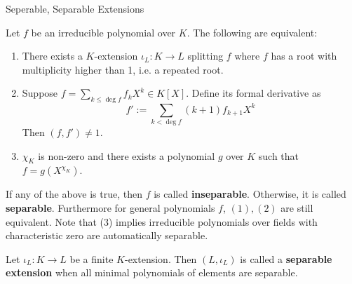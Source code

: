 \documentclass[../book.tex]{subfiles}
\begin{document}
\begin{dfn} Seperable, Separable Extensions

    Let $f$ be an irreducible polynomial over $K$. 
    The following are equivalent: 
    \begin{enumerate}
        \item There exists a $K$-extension $\iota_L : K \to L$ splitting $f$ where
        $f$ has a root with multiplicity higher than 1, i.e. a repeated root.
        \item Suppose $f = \sum_{k \leq \deg f} f_k X^k \in K[X]$.
        Define its formal derivative as 
        \[ f' := \sum_{k < \deg f} (k+1)f_{k+1}X^k \]
        Then $(f,f') \neq 1$.
        \item $\chi_K$ is non-zero and there exists a polynomial $g$ over $K$
        such that $f = g(X^{\chi_K})$.
    \end{enumerate}
    If any of the above is true, then $f$ is called \textbf{inseparable}.
    Otherwise, it is called \textbf{separable}.
    Furthermore for general polynomials $f$, $(1),(2)$ are still equivalent. 
    Note that (3) implies irreducible polynomials over fields with characteristic zero
    are automatically separable. 
    
    Let $\iota_L : K \to L$ be a finite $K$-extension.
    Then $(L,\iota_L)$ is called a \textbf{separable extension} when
    all minimal polynomials of elements are separable. 
\end{dfn}
\end{document}
